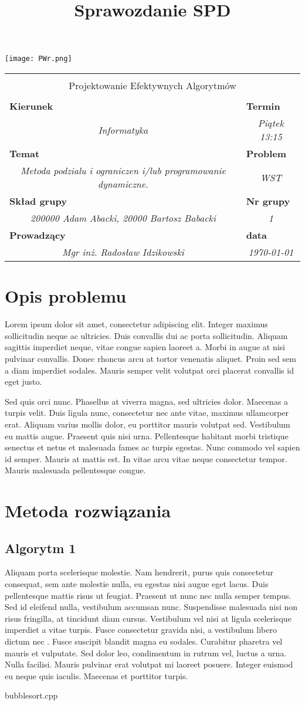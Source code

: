 \documentclass[polish,polish,a4paper]{article}
\title{Sprawozdanie SPD}
\newcommand{\name}[1]{\sffamily\bfseries\scriptsize #1}
\newcommand{\frontpage}[8]{

\hfill\texttt{[image: PWr.png]}
\vspace{2cm}

\begin{tabular}{|p{0.72\textwidth}|p{0.28\textwidth}|}
\hline
\multicolumn{2}{|c|}{}\\
\multicolumn{2}{|c|}{{\LARGE #1}}\\
\multicolumn{2}{|c|}{}\\
\hline
\name{Kierunek} & \name{Termin}\\
\multicolumn{1}{|c|}{\textit{#2}} & \multicolumn{1}{|c|}{\textit{#3}} \\
\hline
\name{Temat} & \name{Problem}\\
\multicolumn{1}{|c|}{\textit{#4}} & \multicolumn{1}{|c|}{\textit{#5}} \\
\hline
\name{Skład grupy} & \name{Nr grupy}\\
\multicolumn{1}{|c|}{\textit{#6}} & \multicolumn{1}{|c|}{\textit{#7}} \\
\hline
\name{Prowadzący} & \name{data}\\
\multicolumn{1}{|c|}{\textit{Mgr inż. Radosław Idzikowski}} & \multicolumn{1}{|c|}{\textit{#8}} \\
\hline
\end{tabular}

}
\begin{document}
\frontpage{Projektowanie Efektywnych Algorytmów}{Informatyka}{Piątek 13:15}{Metoda podzialu i ograniczen i/lub programowanie dynamiczne.}{WST}{200000 Adam Abacki,  20000 Bartosz Babacki}{1}{\today}
\pagestyle{empty}
\newpage
\section{Opis problemu}
Lorem ipsum dolor sit amet, consectetur adipiscing elit. Integer maximus sollicitudin neque ac ultricies. Duis convallis dui ac porta sollicitudin. Aliquam sagittis imperdiet neque, vitae congue sapien laoreet a\cite{Smut2012}. Morbi in augue at nisi pulvinar convallis. Donec rhoncus arcu at tortor venenatis aliquet. Proin sed sem a diam imperdiet sodales. Mauris semper velit volutpat orci placerat convallis id eget justo.

Sed quis orci nunc. Phasellus at viverra magna, sed ultricies dolor. Maecenas a turpis velit. Duis ligula nunc, consectetur nec ante vitae, maximus ullamcorper erat. Aliquam varius mollis dolor, eu porttitor mauris volutpat sed. Vestibulum eu mattis augue. Praesent quis nisi urna. Pellentesque habitant morbi tristique senectus et netus et malesuada fames ac turpis egestas. Nunc commodo vel sapien id semper. Mauris at mattis est. In vitae arcu vitae neque consectetur tempor. Mauris malesuada pellentesque congue.
\section{Metoda rozwiązania}
\subsection{Algorytm 1}
Aliquam porta scelerisque molestie. Nam hendrerit, purus quis consectetur consequat, sem ante molestie nulla, eu egestas nisi augue eget lacus. Duis pellentesque mattis risus ut feugiat. Praesent ut nunc nec nulla semper tempus. Sed id eleifend nulla, vestibulum accumsan nunc. Suspendisse malesuada nisi non risus fringilla, at tincidunt diam cursus. Vestibulum vel nisi at ligula scelerisque imperdiet a vitae turpis. Fusce consectetur gravida nisi, a vestibulum libero dictum nec . Fusce suscipit blandit magna eu sodales. Curabitur pharetra vel mauris et vulputate. Sed dolor leo, condimentum in rutrum vel, luctus a urna. Nulla facilisi. Mauris pulvinar erat volutpat mi laoreet posuere. Integer euismod eu neque quis iaculis. Maecenas et porttitor turpis.

{bubblesort.cpp}
\end{document}
